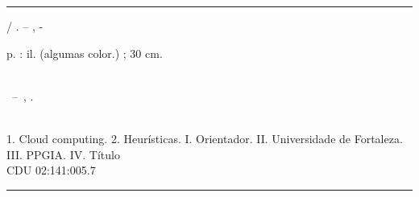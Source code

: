 %
%     
\begin{fichacatalografica}
  \vspace*{\fill}         %
  \hrule              %
  \begin{center}          %
  \begin{minipage}[c]{12.5cm}   %
  
  \imprimirautor
  
  \hspace{0.5cm} \imprimirtitulo  / \imprimirautor. --
  \imprimirlocal, \imprimirdata-
  
  \hspace{0.5cm} \pageref{LastPage} p. : il. (algumas color.) ; 30 cm.\\
  
  \hspace{0.5cm} \imprimirorientadorRotulo~\imprimirorientador\\
  
  \hspace{0.5cm}
  \parbox[t]{\textwidth}{\imprimirtipotrabalho~--~\imprimirinstituicao,
  \imprimirdata.}\\
  
  \hspace{0.5cm}
    1. Cloud computing.
    2. Heurísticas.
    I. Orientador.
    II. Universidade de Fortaleza.
    III. PPGIA.
    IV. Título\\      
  
  \hspace{8.75cm} CDU 02:141:005.7\\
  
  \end{minipage}
  \end{center}
  \hrule
\end{fichacatalografica}
